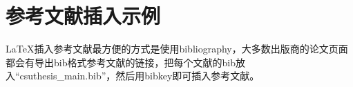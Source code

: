 \section{参考文献插入示例}

LaTeX\cite{lamport1994latex}插入参考文献最方便的方式是使用bibliography\cite{pritchard1969statistical}，大多数出版商的论文页面\cite{lamport1994latex,pritchard1969statistical}都会有导出bib格式参考文献的链接，把每个文献的bib放入``csuthesis\_main.bib''，然后用bibkey即可插入参考文献。

\lipsum

\newpage
